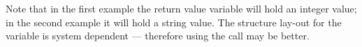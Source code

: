 Note that in the first example the return value variable  will
hold an integer value; in the second example it will hold a string
value.  The structure lay-out for the  variable is
system dependent --- therefore using the  call may be
better.

\begin{seealso}
\end{seealso}
